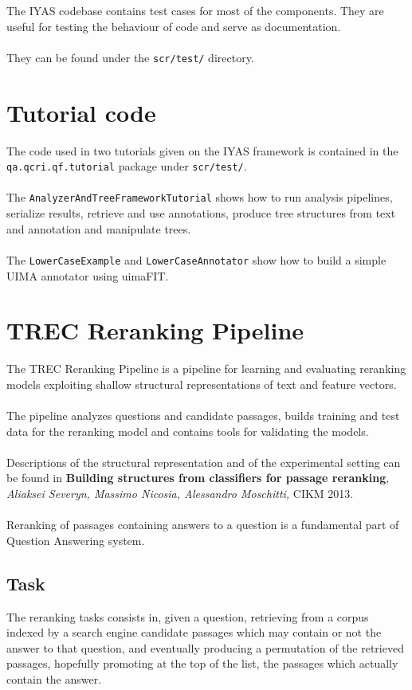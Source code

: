 \documentclass{wileysev}
\begin{document}
The IYAS codebase contains test cases for most of the components. They are useful for testing the behaviour of code and serve as documentation.
\\\\
They can be found under the \texttt{scr/test/} directory.

\section{Tutorial code}

The code used in two tutorials given on the IYAS framework is contained in the\\ \texttt{qa.qcri.qf.tutorial} package under \texttt{scr/test/}.
\\\\
The \texttt{AnalyzerAndTreeFrameworkTutorial} shows how to run analysis pipelines, serialize results, retrieve and use annotations, produce tree structures from text and annotation and manipulate trees.
\\\\
The \texttt{LowerCaseExample} and \texttt{LowerCaseAnnotator} show how to build a simple UIMA annotator using uimaFIT.

\section{TREC Reranking Pipeline}

The TREC Reranking Pipeline is a pipeline for learning and evaluating reranking models exploiting shallow structural representations of text and feature vectors.
\\\\
The pipeline analyzes questions and candidate passages, builds training and test data for the reranking model and contains tools for validating the models.
\\\\
Descriptions of the structural representation and of the experimental setting can be found in \textbf{Building structures from classifiers for passage reranking}, \textit{Aliaksei Severyn,
Massimo Nicosia, Alessandro Moschitti,} CIKM 2013.
\\\\
Reranking of passages containing answers to a question is a fundamental part of Question Answering system. 

\subsection{Task}
The reranking tasks consists in, given a question, retrieving from a corpus indexed by a search engine candidate passages which may contain or not the answer to that question, and eventually producing a permutation of the retrieved passages, hopefully promoting at the top of the list, the passages which actually contain the answer.
\end{document}
